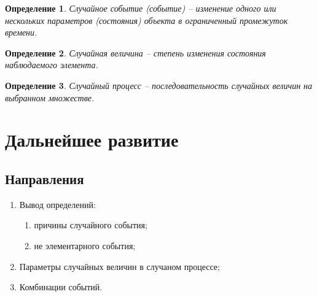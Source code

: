 \documentclass[a4paper,11pt]{report}
\newtheorem{definition}{Определение}
\begin{document}
      \begin{definition}
        Случайное событие (событие) -- изменение одного или нескольких параметров (состояния) объекта в ограниченный промежуток времени.
      \end{definition}
        
      \begin{definition}
        Случайная величина -- степень изменения состояния наблюдаемого элемента.
      \end{definition}
        
      \begin{definition}
        Случайный процесс -- последовательность случайных величин на выбранном множестве.
      \end{definition}

  \chapter{Дальнейшее развитие}
  
    \section{Направления}
      
      \begin{enumerate}
      	\item Вывод определений:
    	    \begin{enumerate}
      	  	\item причины случайного события;
      	  	\item не элементарного события;
          \end{enumerate}
      	\item Параметры случайных величин в случаном процессе;
      	\item Комбинации событий.
      \end{enumerate}
  
\end{document}
